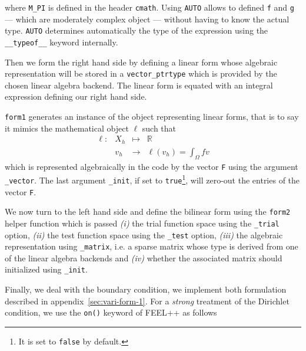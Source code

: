 \documentclass[a4paper]{book}
\begin{document}


\noindent where \lstinline!M_PI! is defined in the header
\lstinline!cmath!.  Using \lstinline!AUTO! allows to defined
\lstinline!f!  and \lstinline!g! --- which are moderately complex
object --- without having to know the actual type. \lstinline!AUTO!
determines automatically the type of the expression using the
\lstinline!__typeof__! keyword internally.

Then we form the right hand side by defining a linear form whose
algebraic representation will be stored in a
\lstinline!vector_ptrtype! which is provided by the chosen linear
algebra backend. The linear form is equated with an integral
expression defining our right hand side.



\noindent \lstinline!form1! generates an instance of the object
representing linear forms, that is to say it mimics the mathematical
object $\ell$ such that
\begin{equation}
  \label{eq:9}
  \begin{array}{rccl}
    \ell: & X_h & \mapsto & \mathbb{R}\\
    & v_h & \rightarrow &\ell(v_h)=\int_\Omega f v
  \end{array}
\end{equation}
which is represented algebraically in the code by the vector
\lstinline!F! using the argument \lstinline!_vector!. The last
argument \lstinline!_init!, if set to \lstinline!true!\footnote{It is
  set to \lstinline!false! by default.}, will zero-out the entries of
the vector \lstinline!F!.


We now turn to the left hand side and define the bilinear form using
the \lstinline!form2! helper function which is passed \textit{(i)} the
trial function space using the \lstinline!_trial! option,
\textit{(ii)} the test function space using the \lstinline!_test!
option, \textit{(iii)} the algebraic representation using
\lstinline!_matrix!, i.e. a sparse matrix whose type is derived from
one of the linear algebra backends and \textit{(iv)} whether the
associated matrix should initialized using
\lstinline!_init!.





Finally, we deal with the boundary condition, we implement both
formulation described in appendix~\ref{sec:vari-form-1}. For a
\emph{strong} treatment of the Dirichlet condition, we use the
\lstinline!on()! keyword of FEEL++ as follows
\end{document}
